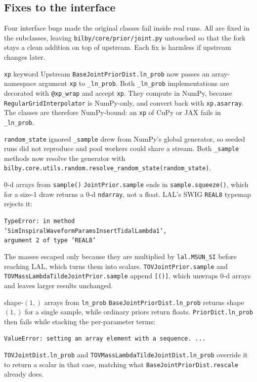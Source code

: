 \documentclass[11pt,a4paper]{article}
\newcommand{\code}[1]{\texttt{#1}}
\begin{document}
\subsection{Fixes to the interface}

Four interface bugs made the original classes fail inside real runs. All are
fixed in the subclasses, leaving \code{bilby/core/prior/joint.py} untouched so
that the fork stays a clean addition on top of upstream. Each fix is harmless if
upstream changes later.

\begin{bugnote}{\code{xp} keyword}
Upstream \code{BaseJointPriorDist.ln\_prob} now passes an array-namespace
argument \code{xp} to \code{\_ln\_prob}. Both \code{\_ln\_prob} implementations
are decorated with \code{@xp\_wrap} and accept \code{xp}. They compute in NumPy,
because \code{RegularGridInterpolator} is NumPy-only, and convert back with
\code{xp.asarray}. The classes are therefore NumPy-bound: an \code{xp} of CuPy
or JAX fails in \code{\_ln\_prob}.
\end{bugnote}

\begin{bugnote}{\code{random\_state} ignored}
\code{\_sample} drew from NumPy's global generator, so seeded runs did not
reproduce and pool workers could share a stream. Both \code{\_sample}
methods now resolve the generator with
\code{bilby.core.utils.random.resolve\_random\_state(random\_state)}.
\end{bugnote}

\begin{bugnote}{0-d arrays from \code{sample()}}
\code{JointPrior.sample} ends in \code{sample.squeeze()}, which for a size-1
draw returns a 0-d \code{ndarray}, not a float. LAL's SWIG \code{REAL8} typemap
rejects it:
\begin{center}
\small\code{TypeError: in method}\\\code{'SimInspiralWaveformParamsInsertTidalLambda1',}\\\code{argument 2 of type 'REAL8'}
\end{center}
The masses escaped only because they are multiplied by \code{lal.MSUN\_SI}
before reaching LAL, which turns them into scalars. \code{TOVJointPrior.sample}
and \code{TOVMassLambdaTildeJointPrior.sample} append \code{[()]}, which unwraps
0-d arrays and leaves larger results unchanged.
\end{bugnote}

\begin{bugnote}{shape-$(1,)$ arrays from \code{ln\_prob}}
\code{BaseJointPriorDist.ln\_prob} returns shape $(1,)$ for a single sample,
while ordinary priors return floats. \code{PriorDict.ln\_prob} then fails while
stacking the per-parameter terms:
\begin{center}
\code{ValueError: setting an array element with a sequence. ...}
\end{center}
\code{TOVJointDist.ln\_prob} and \code{TOVMassLambdaTildeJointDist.ln\_prob}
override it to return a scalar in that case, matching what
\code{BaseJointPriorDist.rescale} already does.
\end{bugnote}
\end{document}
